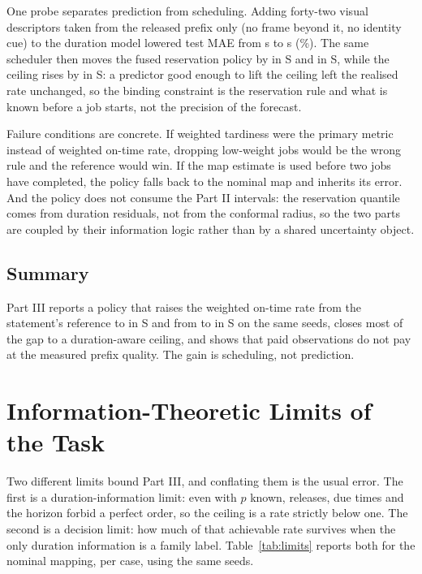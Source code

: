 \documentclass{swmcmthesis}
\begin{document}
One probe separates prediction from scheduling. Adding forty-two visual descriptors
taken from the released prefix only (no frame beyond it, no identity cue) to the
duration model lowered test MAE from \slotPVisDurBase{} s to \slotPVisDurSel{} s
(\slotPVisDurRel{}\%). The same scheduler then moves the fused reservation policy by
\slotPVisSchedSTwoD{} in S\slotCaseTwo{} and \slotPVisSchedSThreeD{} in S\slotCaseThree{},
while the ceiling rises by \slotPVisOracleSThreeD{} in S\slotCaseThree{}: a predictor
good enough to lift the ceiling left the realised rate unchanged, so the binding
constraint is the reservation rule and what is known before a job starts, not the
precision of the forecast.

Failure conditions are concrete. If weighted tardiness were the primary metric
instead of weighted on-time rate, dropping low-weight jobs would be the wrong rule
and the reference would win. If the map estimate is used before two jobs have
completed, the policy falls back to the nominal map and inherits its error. And the
policy does not consume the Part II intervals: the reservation quantile comes from
duration residuals, not from the conformal radius, so the two parts are coupled by
their information logic rather than by a shared uncertainty object.

\subsection{Summary}

Part III reports a policy that raises the weighted on-time rate from the statement's
reference \slotPStochSTwoEDFOldETA{} to \slotPImpSTwoAllCand{} in S\slotCaseTwo{} and
from \slotPStochSThreeEDFOldETA{} to \slotPImpSThreeAllCand{} in S\slotCaseThree{} on
the same seeds, closes most of the gap to a duration-aware ceiling, and shows that
paid observations do not pay at the measured prefix quality. The gain is scheduling,
not prediction.

\section{Information-Theoretic Limits of the Task}
\label{sec:limits}

Two different limits bound Part III, and conflating them is the usual error. The
first is a duration-information limit: even with $p$ known, releases, due times and
the horizon forbid a perfect order, so the ceiling is a rate strictly below one. The
second is a decision limit: how much of that achievable rate survives when the only
duration information is a family label. Table~\ref{tab:limits} reports both for the
nominal mapping, per case, using the same \slotNSeeds{} seeds.
\end{document}
